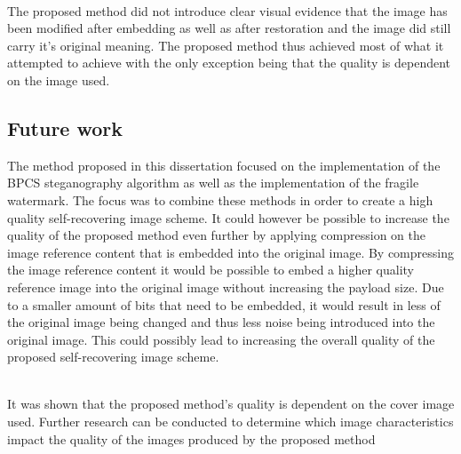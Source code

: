 \documentclass[12pt]{article}
\begin{document}
\hspace{0pt} \\
The proposed method did not introduce clear visual evidence that the image has been modified after embedding as well as after restoration and the image did still carry it's original meaning.
The proposed method thus achieved most of what it attempted to achieve with the only exception being that the quality is dependent on the image used.
 

\subsection{Future work}
The method proposed in this dissertation focused on the implementation of the BPCS steganography algorithm as well as the implementation of the fragile watermark. The focus was to combine these methods in order to create a high quality self-recovering image scheme.
It could however be possible to increase the quality of the proposed method even further by applying compression on the image reference content that is embedded into the original image.
By compressing the image reference content it would be possible to embed a higher quality reference image into the original image without increasing the payload size.
Due to a smaller amount of bits that need to be embedded, it would result in less of the original image being changed and thus less noise being introduced into the original image.
This could possibly lead to increasing the overall quality of the proposed self-recovering image scheme.

\hspace{0pt} \\
It was shown that the proposed method's quality is dependent on the cover image used. Further research can be conducted to determine which image characteristics impact the quality of the images produced by the proposed method



\end{document}
